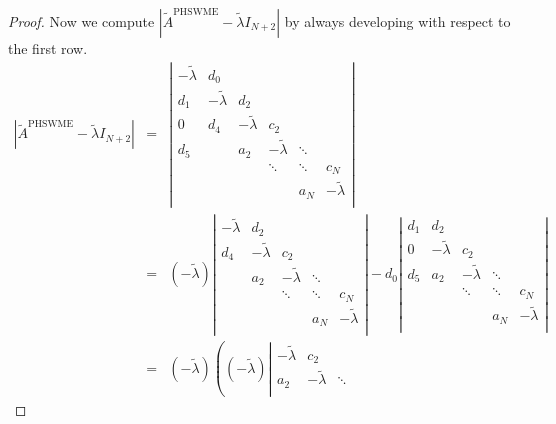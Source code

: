 \documentclass[a4paper, 11pt]{article}
\begin{document}
\begin{proof}
    Now we compute $\left| \widetilde{A}^{{\textrm{PHSWME}}} - \widetilde{\lambda} I_{N+2} \right|$ by always developing with respect to the first row.
    \begin{eqnarray*}
        \left| \widetilde{A}^{{\textrm{PHSWME}}} - \widetilde{\lambda} I_{N+2} \right| &=& \left|
        \begin{array}{cccccc}
        -\widetilde{\lambda}  & d_0 &  &  &  & \\
        d_1 & -\widetilde{\lambda} & d_2 &  & & \\
         0 & d_4 & -\widetilde{\lambda} & c_2  &  &   \\
         d_5 &  & a_2 & -\widetilde{\lambda} & \ddots  &   \\
        &  &  & \ddots & \ddots & c_N \\
         &  &  &  & a_N & -\widetilde{\lambda}  \\
        \end{array}
        \right| \\
      &=& (-\widetilde{\lambda})
      \left|
        \begin{array}{ccccc}
         -\widetilde{\lambda} & d_2 &  & & \\
          d_4 & -\widetilde{\lambda} & c_2  &  &   \\
           & a_2 & -\widetilde{\lambda} & \ddots  &   \\
        &  & \ddots & \ddots & c_N \\
         &  &  & a_N & -\widetilde{\lambda}   \\
        \end{array}
        \right|
        -d_0 \left|
        \begin{array}{ccccc}
        d_1 & d_2 &  &  & \\
         0 &  -\widetilde{\lambda} & c_2  &  &   \\
         d_5 & a_2 & -\widetilde{\lambda} & \ddots  &   \\
        &   & \ddots & \ddots & c_N \\
         &   &  & a_N & -\widetilde{\lambda}   \\
        \end{array}
        \right| \\
        &=& (-\widetilde{\lambda}) \left( (-\widetilde{\lambda})  \left|
        \begin{array}{cccc}
           -\widetilde{\lambda} & c_2  &  &   \\
          a_2 & -\widetilde{\lambda} & \ddots  &   \\

\end{array}
\end{eqnarray*}
\end{proof}
\end{document}
